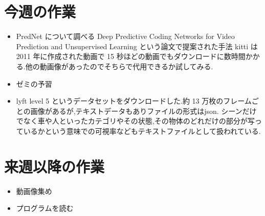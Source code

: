 \section{今週の作業}
\begin{itemize}
          \item PredNet について調べる
          Deep Predictive Coding Networks for Video Prediction and Unsupervised Learning
          という論文で提案された手法
         kitti は2011 年に作成された動画で 15 秒ほどの動画でもダウンロードに数時間かかる.他の動画像があったのでそちらで代用できるか試してみる.
         \item ゼミの予習
         \item lyft level 5 というデータセットをダウンロードした.約 13 万枚のフレームごとの画像があるが,テキストデータもありファイルの形式はjson. シーンだけでなく車や人といったカテゴリやその状態,その物体のどれだけの部分が写っているかという意味での可視率などもテキストファイルとして扱われている.
\end{itemize}

\section{来週以降の作業}
\begin{itemize}
          \item 動画像集め
          \item プログラムを読む
\end{itemize}





